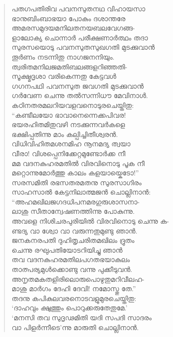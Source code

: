 \begin{verse}
പതഗപതിരിവ പവനസുതനഥ വിഹായസാ\\
ഭാനുബിംബാഭയാ പോകും ദശാന്തരേ\\
അമരസമുദയമനിലതനയബലവേഗങ്ങ-\\
ളാലോക്യ ചൊന്നാര്‍ പരീക്ഷണാര്‍ത്ഥം തദാ\\
സുരസയൊടു പവനസുതസുഖഗതി മുടക്കുവാന്‍\\
തൂര്‍ണം നടന്നിതു നാഗജനനിയും.\\
ത്വരിതമനിലജമതിബലങ്ങളറിഞ്ഞതി-\\
സൂക്ഷ്മദൃശാ വരികെന്നതു കേട്ടവള്‍\\
ഗഗനപഥി പവനസുത ജവഗതി മുടക്കുവാന്‍\\
ഗര്‍വേണ ചെന്നു തല്‍സന്നിധൗ മേവിനാള്‍.\\
കഠിനതരമലറിയവളവനൊടുരചെയ്തിതു:\\
“കണ്ടീലയോ ഭാവാനെന്നെക്കപിവര!\\
ഭയരഹിതമിതുവഴി നടക്കുന്നവര്‍കളെ\\
ഭക്ഷിപ്പതിന്നു മാം കല്പിച്ചിതീശ്വരന്‍.\\
വിധിവിഹിതമശനമിഹ നൂനമദ്യ ത്വയാ\\
വീരാ! വിശപ്പെനിക്കേറ്റമുണ്ടോര്‍ക്ക നീ\\
മമ വദനകുഹരമതില്‍ വിരവിനൊടു പൂക നീ\\
മറ്റൊന്നുമോര്‍ത്തു കാലം കളയായ്കെടോ!”\\
സരസമിതി രഭസതരമതനു സുരസാഗിരം\\
സാഹസാല്‍ കേട്ടനിലാത്മജന്‍ ചൊല്ലിനാന്‍:\\
“അഹമഖിലജഗദധിപനമരഗുരുശാസനാ-\\
ലാശു സീതാന്വേഷണത്തിന്നു പോകുന്നു.\\
അവളെ നിശിചരപുരിയില്‍ വിരവിനൊടു ചെന്നു ക-\\
ണ്ടദ്യ വാ ശ്വോ വാ വരുന്നതുമുണ്ടു ഞാന്‍.\\
ജനകനരപതി ദുഹിതൃചരിതമഖിലം ദ്രുതം\\
ചെന്നു രഘുപതിയോടറിയിച്ചു ഞാന്‍\\
തവ വദനകുഹരമതിലപഗതഭയാകുലം\\
താത്പര്യമുള്‍ക്കൊണ്ടു വന്നു പുക്കീടുവന്‍.\\
അനൃതമകതളിരിലൊരുപൊഴുതുമറിവീലഹ-\\
മാശു മാര്‍ഗം ദേഹി ദേവി! നമോസ്തു തേ.”\\
തദനു കപികുലവരനൊടവളുമുരചെയ്തിതു:\\
‘ദാഹവും ക്ഷുത്തും പൊറുക്കരുതേതുമേ.’\\
‘മനസി തവ സുദൃഢമിതി യദി സപദി സാദരം\\
വാ പിളര്‍ന്നീടെ’ന്നു മാരുതി ചൊല്ലിനാന്‍.\\

\end{verse}
